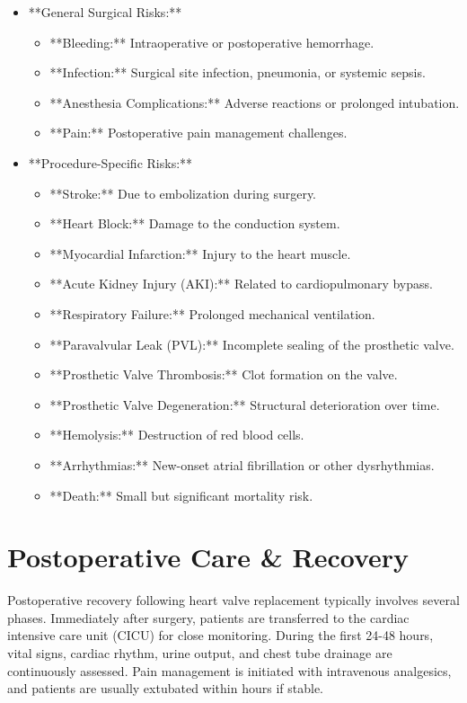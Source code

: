 \begin{itemize}
  \item **General Surgical Risks:**
  \begin{itemize}
    \item **Bleeding:** Intraoperative or postoperative hemorrhage.
    \item **Infection:** Surgical site infection, pneumonia, or systemic sepsis.
    \item **Anesthesia Complications:** Adverse reactions or prolonged intubation.
    \item **Pain:** Postoperative pain management challenges.
  \end{itemize}
  
  \item **Procedure-Specific Risks:**
  \begin{itemize}
    \item **Stroke:** Due to embolization during surgery.
    \item **Heart Block:** Damage to the conduction system.
    \item **Myocardial Infarction:** Injury to the heart muscle.
    \item **Acute Kidney Injury (AKI):** Related to cardiopulmonary bypass.
    \item **Respiratory Failure:** Prolonged mechanical ventilation.
    \item **Paravalvular Leak (PVL):** Incomplete sealing of the prosthetic valve.
    \item **Prosthetic Valve Thrombosis:** Clot formation on the valve.
    \item **Prosthetic Valve Degeneration:** Structural deterioration over time.
    \item **Hemolysis:** Destruction of red blood cells.
    \item **Arrhythmias:** New-onset atrial fibrillation or other dysrhythmias.
    \item **Death:** Small but significant mortality risk.
  \end{itemize}
\end{itemize}

\section*{Postoperative Care \& Recovery}
Postoperative recovery following heart valve replacement typically involves several phases. Immediately after surgery, patients are transferred to the cardiac intensive care unit (CICU) for close monitoring. During the first 24-48 hours, vital signs, cardiac rhythm, urine output, and chest tube drainage are continuously assessed. Pain management is initiated with intravenous analgesics, and patients are usually extubated within hours if stable.

